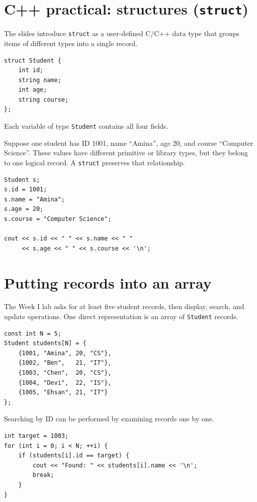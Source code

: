 \section{C++ practical: structures (\texttt{struct})}

The slides introduce \texttt{struct} as a user-defined C/C++ data type that groups items of different types into a single record.

\begin{lstlisting}
struct Student {
    int id;
    string name;
    int age;
    string course;
};
\end{lstlisting}

Each variable of type \texttt{Student} contains all four fields.

\begin{workedexample}
Suppose one student has ID 1001, name ``Amina'', age 20, and course ``Computer Science''. These values have different primitive or library types, but they belong to one logical record. A \texttt{struct} preserves that relationship.
\end{workedexample}

\begin{lstlisting}
Student s;
s.id = 1001;
s.name = "Amina";
s.age = 20;
s.course = "Computer Science";

cout << s.id << " " << s.name << " "
     << s.age << " " << s.course << '\n';
\end{lstlisting}

\section{Putting records into an array}

The Week I lab asks for at least five student records, then display, search, and update operations. One direct representation is an array of \texttt{Student} records.

\begin{lstlisting}
const int N = 5;
Student students[N] = {
    {1001, "Amina", 20, "CS"},
    {1002, "Ben",   21, "IT"},
    {1003, "Chen",  20, "CS"},
    {1004, "Devi",  22, "IS"},
    {1005, "Ehsan", 21, "IT"}
};
\end{lstlisting}

Searching by ID can be performed by examining records one by one.

\begin{lstlisting}
int target = 1003;
for (int i = 0; i < N; ++i) {
    if (students[i].id == target) {
        cout << "Found: " << students[i].name << '\n';
        break;
    }
}
\end{lstlisting}

